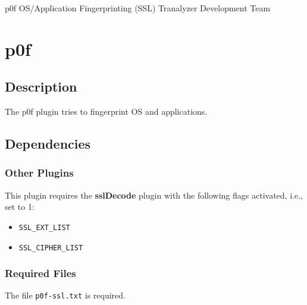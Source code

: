 \documentclass[documentation]{subfiles}
\begin{document}
\trantitle
    {p0f} %
    {OS/Application Fingerprinting (SSL)} %
    {Tranalyzer Development Team} %

\section{p0f}\label{s:p0f}

\subsection{Description}
The p0f plugin tries to fingerprint OS and applications.

\subsection{Dependencies}

\subsubsection{Other Plugins}
This plugin requires the {\bf sslDecode} plugin with the following flags activated, i.e., set to 1:
\begin{itemize}
    \item {\tt SSL\_EXT\_LIST}
    \item {\tt SSL\_CIPHER\_LIST}
\end{itemize}

\subsubsection{Required Files}
The file {\tt p0f-ssl.txt} is required.
\end{document}
